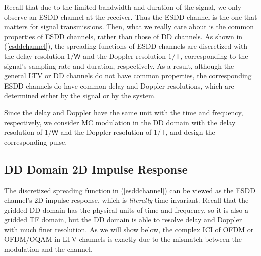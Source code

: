 \documentclass[journal]{IEEEtran}
\begin{document}
Recall that due to the limited bandwidth and duration of the signal, we only observe an ESDD channel at the receiver. Thus the ESDD channel is the one that matters for signal transmissions. Then, what we really care about is the common properties of ESDD channels,  rather than those of DD channels.
As shown in (\ref{esddchannel}), the spreading functions of ESDD channels are discretized with the delay resolution $1/\mathsf W$ and the Doppler resolution  $1/\mathsf T$, corresponding to the signal's sampling rate and duration, respectively.
As a result, although the general LTV or DD channels do not have common properties, the corresponding ESDD channels do have common delay and Doppler resolutions, which are determined either by the signal or by the system.

Since the delay and Doppler have the same unit with the time and frequency, respectively, we consider MC modulation in the DD domain with the delay resolution of $1/\mathsf W$ and the Doppler resolution of $1/\mathsf T$, and design the corresponding pulse.



\subsection{DD Domain 2D Impulse Response}
The discretized spreading function in (\ref{esddchannel}) can be viewed as the ESDD channel's 2D impulse response, which is \emph{literally} time-invariant.
Recall that the {gridded} DD domain has the physical units of time and frequency, so it is also a {gridded} TF domain, 
but the DD domain is able to resolve delay and Doppler with much finer resolution.
As we will show below, the complex ICI of OFDM or OFDM/OQAM in LTV channels is exactly due to the 
mismatch between the modulation and the channel.
\end{document}
